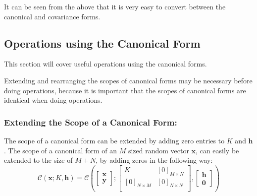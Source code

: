 \documentclass[12pt,oneside,openany,a4paper, %
afrikaans,english,
]{memoir}
\numberwithin{equation}{chapter}
\begin{document}
It can be seen from the above that it is very easy to convert between the canonical and covariance forms. 
\subsection{Operations using the Canonical Form}
This section will cover useful operations using the canonical forms. 

Extending and rearranging the scopes of canonical forms may be necessary before doing operations, because it is important that the scopes of canonical forms are identical when doing operations. 
\subsubsection{Extending the Scope of a Canonical Form:}
The scope of a canonical form can be extended by adding zero entries to $K$ and $\bm{h}$. The scope of a canonical form of an $M$ sized random vector $\bm{x}$, can easily be extended to the size of $M + N$, by adding zeros in the following way:
\begin{equation}
\mathcal{C}\left(\bm{x};K,\bm{h}\right)
=
\mathcal{C}\left(
\begin{bmatrix}
\bm{x}\\
\bm{y}
\end{bmatrix};
\begin{bmatrix}
K & [0]_{M \times N}\\
[0]_{N \times M} & [0]_{N \times N}\\
\end{bmatrix},
\begin{bmatrix}
\bm{h}\\
\bm{0}
\end{bmatrix}
\right)
\end{equation}
\end{document}
